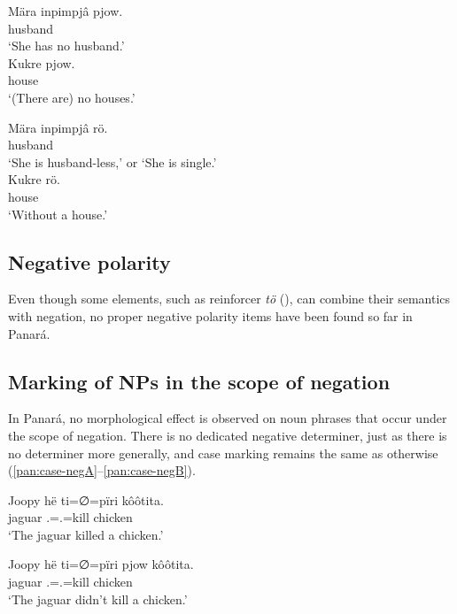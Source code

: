 \documentclass[output=paper,colorlinks,citecolor=brown,draft]{langscibook}
\begin{document}
\ea\label{pan:pjow-ex}
    \ea
    \gll Mära inpimpjâ pjow. \\
        \Tsg{} husband \Neg{}  \\
        \glt `She has no husband.' \\
    \ex
        \gll Kukre pjow. \\
        house \Neg{} \\
        \glt `(There are) no houses.' \\
    \z
\z

\ea\label{pan:ro-ex}
    \ea
        \gll Mära inpimpjâ rö. \\
        \Tsg{} husband \Neg{}  \\
        \glt `She is husband-less,' or `She is single.' \\
    \ex
        \gll Kukre rö. \\
        house \Neg{} \\
        \glt `Without a house.' \\
    \z
\z

\subsection{Negative polarity}\label{pan:sec:polarity}

Even though some elements, such as reinforcer \textit{tö} (), can combine their semantics with negation, no proper negative polarity items have been found so far in Panará.

\subsection{Marking of NPs in the scope of negation}\label{pan:sec:NP-marking}

In Panará, no morphological effect is observed on noun phrases that occur under the scope of negation. There is no dedicated negative determiner, just as there is no determiner more generally, and case marking remains the same as otherwise (\ref{pan:case-negA}--\ref{pan:case-negB}).

\ea\label{pan:case-negA}
    \gll Joopy hë ti=∅=pïri kôôtita. \\
    jaguar \Erg{} \Tsg.\Erg{}=\Tsg.\Abs{}=kill chicken  \\
    \glt `The jaguar killed a chicken.' \\
\z

\ea\label{pan:case-negB}
    \gll Joopy hë ti=∅=pïri pjow kôôtita. \\
    jaguar \Erg{} \Tsg.\Erg{}=\Tsg.\Abs{}=kill \Neg{} chicken  \\
    \glt `The jaguar didn't kill a chicken.' \\
\z
\end{document}
